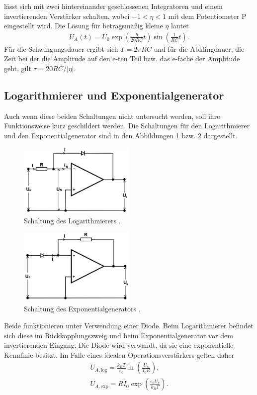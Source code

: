lässt sich mit zwei hintereinander geschlossenen Integratoren und einem invertierenden
Verstärker schalten, wobei $-1<\eta<1$ mit dem Potentiometer P eingestellt wird. Die Lösung
für betragsmäßig kleine $\eta$ lautet
\begin{align}
 U_A(t) = U_0 \exp\left(\frac{\eta}{20RC}t\right) \sin\left(\frac{1}{RC}t\right).
 \label{eq:sinusGen}
\end{align}
Für die Schwingungsdauer ergibt sich $T=2\pi RC$ und für die Abklingdauer,
die Zeit bei der die Amplitude auf den e-ten Teil bzw. das e-fache der Amplitude geht,
gilt $\tau = 20RC/|\eta|$.

\subsection{Logarithmierer und Exponentialgenerator}
Auch wenn diese beiden Schaltungen nicht untersucht werden, soll ihre
Funktionsweise kurz geschildert werden. Die Schaltungen für den 
Logarithmierer und den Exponentialgenerator sind in den Abbildungen
\ref{pic:log} bzw. \ref{pic:exp} dargestellt.
\begin{figure}[t]
 \includegraphics[width = 0.5\textwidth]{../pics/log.png}
 \caption{Schaltung des Logarithmierers \cite{Anl}.}
 \label{pic:log}
\end{figure}
\begin{figure}[t]
 \includegraphics[width = 0.5\textwidth]{../pics/exp.png}
 \caption{Schaltung des Exponentialgenerators \cite{Anl}.}
 \label{pic:exp}
\end{figure}
Beide funktionieren unter Verwendung einer Diode. Beim Logarithmierer
befindet sich diese im Rückkopplungszweig und beim Exponentialgenerator
vor dem invertierenden Eingang. Die Diode wird verwandt, da sie eine
exponentielle Kennlinie besitzt. Im Falle eines idealen Operationsverstärkers
gelten daher
\begin{align}
 U_{A,\text{log}} = \frac{k_BT}{e_0} \ln\left(\frac{U_e}{I_0 R}\right),\\
 U_{A,\text{exp}} = RI_0\exp\left(\frac{e_0U_e}{k_BT}\right).
\end{align}



